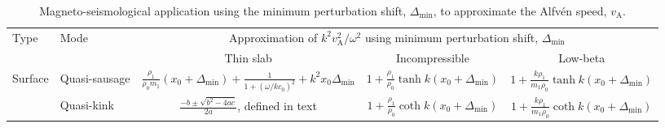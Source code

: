 \documentclass[namedreferences]{solarphysics}
\numberwithin{equation}{section}
\begin{document}
\begin{article}
\begin{landscape}
\begin{table}
\caption{Magneto-seismological application using the minimum perturbation shift, $\Delta_\textrm{min}$, to approximate the Alfv\'{e}n speed, $v_\textrm{A}$.}
\begin{tabular}{llccc}
  \toprule
Type & Mode & \multicolumn{3}{c}{Approximation of $k^2v_\textrm{A}^2 / \omega^2$ using minimum perturbation shift, $\Delta_\textrm{min}$} \\
\cmidrule(lr){3-5}
	 &	    & Thin slab & Incompressible & Low-beta \\
  \midrule
\multirow{2}{*}{Surface} & Quasi-sausage & $ \frac{\rho_1}{\rho_0m_1}(x_0 + \Delta_\textrm{min}) + \frac{1}{1 + (\omega / kc_0)^2} + k^2x_0\Delta_\textrm{min} $ & $ 1 + \frac{\rho_1}{\rho_0}\tanh{k(x_0 + \Delta_\textrm{min})} $ & $ 1 + \frac{k\rho_1}{m_1\rho_0}\tanh{k(x_0 + \Delta_\textrm{min})} $ \\
						   & Quasi-kink	   & $\frac{-b \pm \sqrt{b^2 - 4ac}}{2a}$, defined in text & $ 1 + \frac{\rho_1}{\rho_0}\coth{k(x_0 + \Delta_\textrm{min})} $ & $ 1 + \frac{k\rho_1}{m_1\rho_0}\coth{k(x_0 + \Delta_\textrm{min})} $ \\
  \bottomrule
\end{tabular} \label{table: shift in min pert}
\end{table}

\end{landscape}


\end{article}
\end{document}
